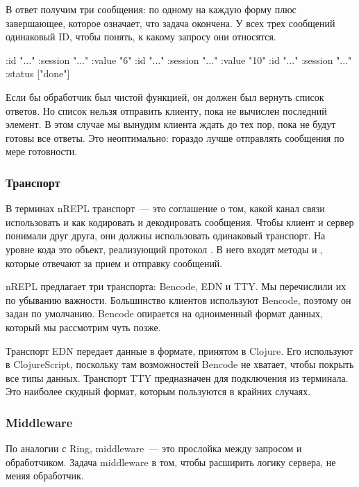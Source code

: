 В ответ получим три сообщения: по одному на каждую форму плюс завершающее, которое означает, что задача окончена. У всех трех сообщений одинаковый ID, чтобы понять, к какому запросу они относятся.

\begin{english}
  \begin{clojure}
{:id "..." :session "..." :value "6"}
{:id "..." :session "..." :value "10"}
{:id "..." :session "..." :status ["done"]}
  \end{clojure}
\end{english}

Если бы обработчик был чистой функцией, он должен был вернуть список ответов. Но список нельзя отправить клиенту, пока не вычислен последний элемент. В этом случае мы вынудим клиента ждать до тех пор, пока не будут готовы все ответы. Это неоптимально: гораздо лучше отправлять сообщения по мере готовности.

\subsubsection{Транспорт}

В терминах nREPL транспорт~--- это соглашение о том, какой канал связи использовать и как кодировать и декодировать сообщения. Чтобы клиент и сервер понимали друг друга, они должны использовать одинаковый транспорт. На уровне кода это объект, реализующий протокол . В него входят методы  и , которые отвечают за прием и отправку сообщений.

nREPL предлагает три транспорта: Bencode, EDN и TTY. Мы перечислили их по убыванию важности. Большинство клиентов используют Bencode, поэтому он задан по умолчанию. Bencode опирается на одноименный формат данных, который мы рассмотрим чуть позже.

Транспорт EDN передает данные в формате, принятом в Clojure. Его используют в ClojureScript, поскольку там возможностей Bencode не хватает, чтобы покрыть все типы данных. Транспорт TTY предназначен для подключения из терминала. Это наиболее скудный формат, которым пользуются в крайних случаях.

\subsubsection{Middleware}

По аналогии с Ring, middleware~--- это прослойка между запросом и обработчиком. Задача middleware в том, чтобы расширить логику сервера, не меняя обработчик.

